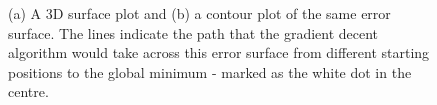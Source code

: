\documentclass[xcolor={table}]{beamer}
\begin{document}
 \begin{frame} 
\begin{figure}[htb]
\begin{center}
\caption{(a) A 3D surface plot and (b) a contour plot of the same error surface. The lines indicate the path that the gradient decent algorithm would take across this error surface from different starting positions to the global minimum - marked as the white dot in the centre.}
\label{fig:gradientDescentErrorExamples}
\end{center}
\end{figure}
\end{frame} 
\end{document}
